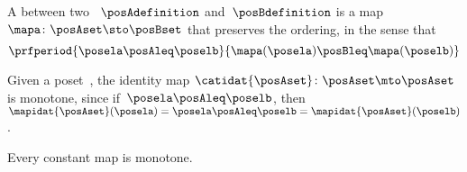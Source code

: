 \begin{definition}
    \label{def:monotone}
    A  between two ~$\posAdefinition$ and~$\posBdefinition$ is a map~$\mapa \colon \posAset \sto \posBset$ that preserves the ordering, in the sense that
    \begin{equation}\label{eq:monotone-map-definition}
        \prfperiod{
            \posela \posAleq \poselb
        }{
            \mapa(\posela) \posBleq \mapa(\poselb)
        }
    \end{equation}
\end{definition}
\showslides{
    \begin{forslides}
        \begin{equation}\label{eq:monotone-map-identity}
            \prfperiod{
                \posela \posAleq \poselb
            }{
                \posela \posAleq \poselb
            }
        \end{equation}
        \begin{equation}\label{eq:monotone-map-discrete-1}
            \prfdoubleperiod{
                \posela \posAleq \poselb
            }{
                \posela = \poselb
            }
        \end{equation}
        \begin{equation}\label{eq:monotone-map-discrete-2}
            \prfperiod{
                \posela \posAleq \posela
            }{
                \mora(\posela) \posAleq \mora(\posela)
            }
        \end{equation}
        \begin{equation}\label{eq:monotone-map-constant}
            \prfperiod{
                \posela \posAleq \poselb
            }{
                \poselc \posAleq \poselc
            }
        \end{equation}
    \end{forslides}
}

\begin{example}
    Given a poset~\posA, the identity map $\catidat{\posAset}\colon \posAset \mto\linebreak[0] \posAset$ is monotone, since if~$\posela\posAleq \poselb$, then~$\mapidat{\posAset}(\posela)=\posela \posAleq \poselb = \mapidat{\posAset}(\poselb )$.
\end{example}

\begin{example}
    Every constant map is monotone.
\end{example}

